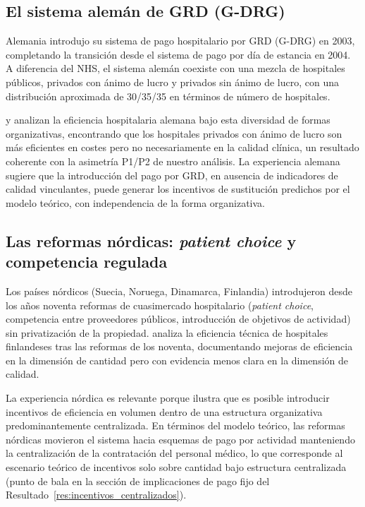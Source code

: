 \documentclass[12pt, a4paper, twoside, openright]{book}
\theoremstyle{plain}
\theoremstyle{definition}
\theoremstyle{remark}
\begin{document}
\subsection{El sistema alemán de GRD (G-DRG)}

Alemania introdujo su sistema de pago hospitalario por GRD (G-DRG) en 2003, completando la transición desde el sistema de pago por día de estancia en 2004. A diferencia del NHS, el sistema alemán coexiste con una mezcla de hospitales públicos, privados con ánimo de lucro y privados sin ánimo de lucro, con una distribución aproximada de 30/35/35 en términos de número de hospitales.

\citet{herr2011} y \citet{tiemann2012} analizan la eficiencia hospitalaria alemana bajo esta diversidad de formas organizativas, encontrando que los hospitales privados con ánimo de lucro son más eficientes en costes pero no necesariamente en la calidad clínica, un resultado coherente con la asimetría P1/P2 de nuestro análisis. La experiencia alemana sugiere que la introducción del pago por GRD, en ausencia de indicadores de calidad vinculantes, puede generar los incentivos de sustitución predichos por el modelo teórico, con independencia de la forma organizativa.

\subsection{Las reformas nórdicas: \textit{patient choice} y competencia regulada}

Los países nórdicos (Suecia, Noruega, Dinamarca, Finlandia) introdujeron desde los años noventa reformas de cuasimercado hospitalario (\textit{patient choice}, competencia entre proveedores públicos, introducción de objetivos de actividad) sin privatización de la propiedad. \citet{linna1998} analiza la eficiencia técnica de hospitales finlandeses tras las reformas de los noventa, documentando mejoras de eficiencia en la dimensión de cantidad pero con evidencia menos clara en la dimensión de calidad.

La experiencia nórdica es relevante porque ilustra que es posible introducir incentivos de eficiencia en volumen dentro de una estructura organizativa predominantemente centralizada. En términos del modelo teórico, las reformas nórdicas movieron el sistema hacia esquemas de pago por actividad manteniendo la centralización de la contratación del personal médico, lo que corresponde al escenario teórico de incentivos solo sobre cantidad bajo estructura centralizada (punto de bala en la sección de implicaciones de pago fijo del Resultado~\ref{res:incentivos_centralizados}).
\end{document}
